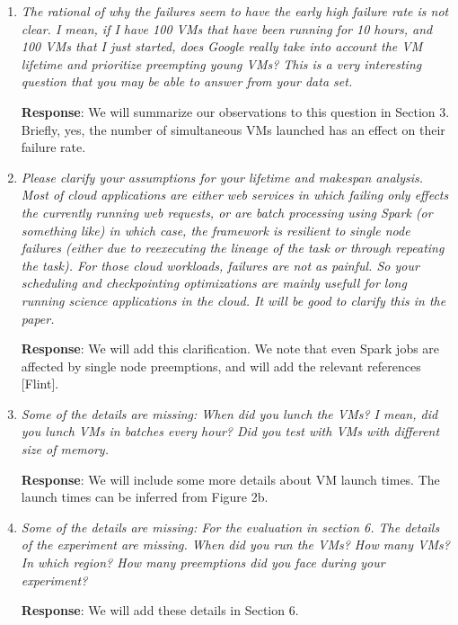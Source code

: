 \documentclass{article}
\newcommand{\resp}[1]{\textbf{Response}: #1}
\newcommand{\revmade}[1]{\textbf{Revision Made}: #1}
\begin{document}
\begin{enumerate}

\item \emph{The rational of why the failures seem to have the early high failure rate is not clear. I mean, if I have 100 VMs that have been running for 10 hours, and 100 VMs that I just started, does Google really take into account the VM lifetime and prioritize preempting young VMs? This is a very interesting question that you may be able to answer from your data set.}

\resp{We will summarize our observations to this question in Section 3. Briefly, yes, the number of simultaneous VMs launched has an effect on their failure rate.}


\item \emph{Please clarify your assumptions for your lifetime and makespan analysis. Most of cloud applications are either web services in which failing only effects the currently running web requests, or are batch processing using Spark (or something like) in which case, the framework is resilient to single node failures (either due to reexecuting the lineage of the task or through repeating the task). For those cloud workloads, failures are not as painful. So your scheduling and checkpointing optimizations are mainly usefull for long running science applications in the cloud. It will be good to clarify this in the paper.}

\resp{We will add this clarification. We note that even Spark jobs are affected by single node preemptions, and will add the relevant references [Flint]}.


\item \emph{Some of the details are missing: When did you lunch the VMs? I mean, did you lunch VMs in batches every hour? Did you test with VMs with different size of memory.}

\resp{We will include some more details about VM launch times. The launch times can be inferred from Figure 2b.}

\item \emph{Some of the details are missing: For the evaluation in section 6. The details of the experiment are missing. When did you run the VMs? How many VMs? In which region? How many preemptions did you face during your experiment?}

\resp{We will add these details in Section 6.}

\end{enumerate}
\end{document}
